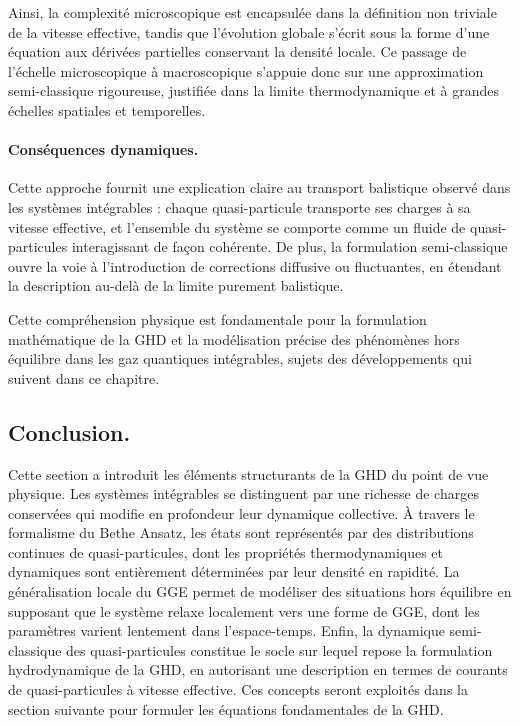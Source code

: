 Ainsi, la complexité microscopique est encapsulée dans la définition non triviale de la vitesse effective, tandis que l’évolution globale s’écrit sous la forme d’une équation aux dérivées partielles conservant la densité locale. Ce passage de l’échelle microscopique à macroscopique s’appuie donc sur une approximation semi-classique rigoureuse, justifiée dans la limite thermodynamique et à grandes échelles spatiales et temporelles.

\paragraph{Conséquences dynamiques.}
Cette approche fournit une explication claire au transport balistique observé dans les systèmes intégrables : chaque quasi-particule transporte ses charges à sa vitesse effective, et l’ensemble du système se comporte comme un fluide de quasi-particules interagissant de façon cohérente. De plus, la formulation semi-classique ouvre la voie à l’introduction de corrections diffusive ou fluctuantes, en étendant la description au-delà de la limite purement balistique.

Cette compréhension physique est fondamentale pour la formulation mathématique de la GHD et la modélisation précise des phénomènes hors équilibre dans les gaz quantiques intégrables, sujets des développements qui suivent dans ce chapitre.


\subsection*{Conclusion.}
Cette section a introduit les éléments structurants de la GHD du point de vue physique. Les systèmes intégrables se distinguent par une richesse de charges conservées qui modifie en profondeur leur dynamique collective. À travers le formalisme du Bethe Ansatz, les états sont représentés par des distributions continues de quasi-particules, dont les propriétés thermodynamiques et dynamiques sont entièrement déterminées par leur densité en rapidité. La généralisation locale du GGE permet de modéliser des situations hors équilibre en supposant que le système relaxe localement vers une forme de GGE, dont les paramètres varient lentement dans l’espace-temps. Enfin, la dynamique semi-classique des quasi-particules constitue le socle sur lequel repose la formulation hydrodynamique de la GHD, en autorisant une description en termes de courants de quasi-particules à vitesse effective. Ces concepts seront exploités dans la section suivante pour formuler les équations fondamentales de la GHD.

